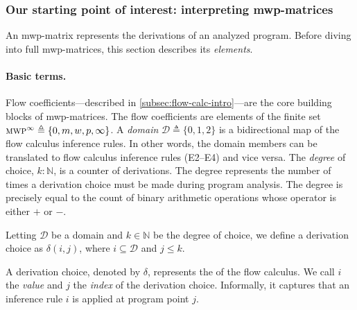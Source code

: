 \subsubsection{Our starting point of interest: interpreting mwp-matrices}
\label{subsec:mat-decode}

An mwp-matrix represents the derivations of an analyzed program.
Before diving into full mwp-matrices, this section describes its \emph{elements}.

\paragraph*{Basic terms.}
Flow coefficients---described in \autoref{subsec:flow-calc-intro}---are the core building blocks of mwp-matrices.
The flow coefficients are elements of the finite set \(\text{\textsc{mwp}}^\infty \triangleq \{0, m, w, p,\infty\}\).
A \emph{domain} \(\mathcal{D} \triangleq \{0, 1, 2 \}\) is a bidirectional map of the flow calculus inference rules.
In other words, the domain members can be translated to flow calculus inference rules (E2--E4) and vice versa.
The \emph{degree} of choice, \(k : \mathbb{N}\), is a counter of derivations.
The degree represents the number of times a derivation choice must be made during program analysis.
The degree is precisely equal to the count of binary arithmetic operations whose operator is either \(+\) or \(-\).

\begin{definition}
    Letting \( \mathcal{D} \) be a domain and \( k \in \mathbb{N} \) be the degree of choice,
    we define a derivation choice as \( \delta(i, j) \), where \( i \subseteq \mathcal{D} \) and \( j \leq k \).\end{definition}
A derivation choice, denoted by \(\delta\), represents the  of the flow calculus.
We call \(i\) the \emph{value} and \(j\) the \emph{index} of the derivation choice.
Informally, it captures that an inference rule \(i\) is applied at program point \(j\).

